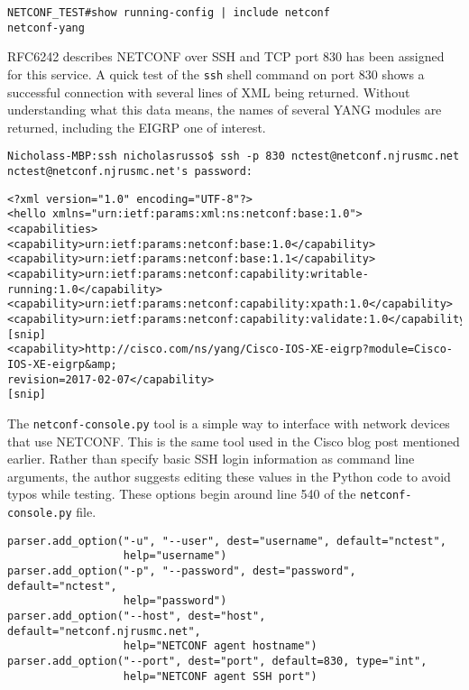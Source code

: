 \begin{verbatim}
NETCONF_TEST#show running-config | include netconf
netconf-yang
\end{verbatim}

RFC6242 describes NETCONF over SSH and TCP port 830 has been assigned for this
service. A quick test of the \verb|ssh| shell command on port 830 shows a
successful connection with several lines of XML being returned. Without
understanding what this data means, the names of several YANG modules are
returned, including the EIGRP one of interest.

\begin{verbatim}
Nicholass-MBP:ssh nicholasrusso$ ssh -p 830 nctest@netconf.njrusmc.net
nctest@netconf.njrusmc.net's password:
\end{verbatim}

\begin{verbatim}
<?xml version="1.0" encoding="UTF-8"?>
<hello xmlns="urn:ietf:params:xml:ns:netconf:base:1.0">
<capabilities>
<capability>urn:ietf:params:netconf:base:1.0</capability>
<capability>urn:ietf:params:netconf:base:1.1</capability>
<capability>urn:ietf:params:netconf:capability:writable-running:1.0</capability>
<capability>urn:ietf:params:netconf:capability:xpath:1.0</capability>
<capability>urn:ietf:params:netconf:capability:validate:1.0</capability>
[snip]
<capability>http://cisco.com/ns/yang/Cisco-IOS-XE-eigrp?module=Cisco-IOS-XE-eigrp&amp;
revision=2017-02-07</capability>
[snip]
\end{verbatim}

The \verb|netconf-console.py| tool is a simple way to interface with network
devices that use NETCONF. This is the same tool used in the Cisco blog post
mentioned earlier. Rather than specify basic SSH login information as command
line arguments, the author suggests editing these values in the Python code to
avoid typos while testing. These options begin around line 540 of the
\verb|netconf-console.py| file.

\begin{verbatim}
parser.add_option("-u", "--user", dest="username", default="nctest",
                  help="username")
parser.add_option("-p", "--password", dest="password", default="nctest",
                  help="password")
parser.add_option("--host", dest="host", default="netconf.njrusmc.net",
                  help="NETCONF agent hostname")
parser.add_option("--port", dest="port", default=830, type="int",
                  help="NETCONF agent SSH port")
\end{verbatim}

